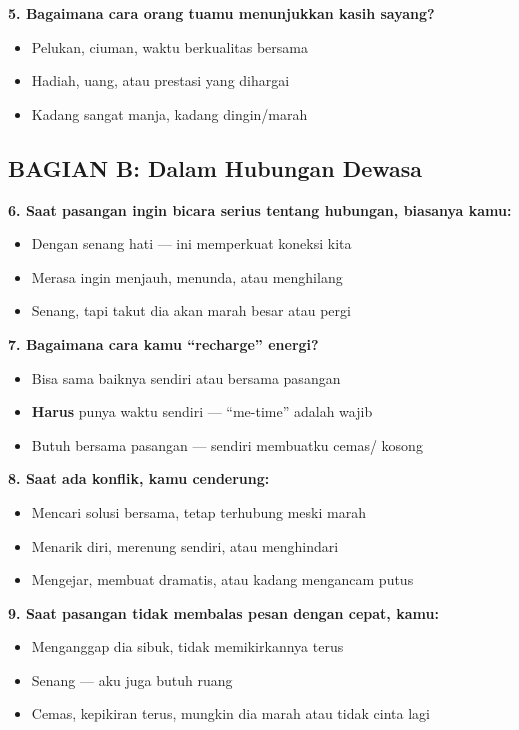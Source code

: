 \begin{exercisebox}
\textbf{5. Bagaimana cara orang tuamu menunjukkan kasih sayang?}
\begin{itemize}
    \item[A] Pelukan, ciuman, waktu berkualitas bersama
    \item[B] Hadiah, uang, atau prestasi yang dihargai
    \item[C] Kadang sangat manja, kadang dingin/marah
\end{itemize}

\subsection*{BAGIAN B: Dalam Hubungan Dewasa}

\textbf{6. Saat pasangan ingin bicara serius tentang hubungan, biasanya kamu:}
\begin{itemize}
    \item[A] Dengan senang hati --- ini memperkuat koneksi kita
    \item[B] Merasa ingin menjauh, menunda, atau menghilang
    \item[C] Senang, tapi takut dia akan marah besar atau pergi
\end{itemize}

\textbf{7. Bagaimana cara kamu ``recharge'' energi?}
\begin{itemize}
    \item[A] Bisa sama baiknya sendiri atau bersama pasangan
    \item[B] \textbf{Harus} punya waktu sendiri --- ``me-time'' adalah wajib
    \item[C] Butuh bersama pasangan --- sendiri membuatku cemas/ kosong
\end{itemize}

\textbf{8. Saat ada konflik, kamu cenderung:}
\begin{itemize}
    \item[A] Mencari solusi bersama, tetap terhubung meski marah
    \item[B] Menarik diri, merenung sendiri, atau menghindari
    \item[C] Mengejar, membuat dramatis, atau kadang mengancam putus
\end{itemize}

\textbf{9. Saat pasangan tidak membalas pesan dengan cepat, kamu:}
\begin{itemize}
    \item[A] Menganggap dia sibuk, tidak memikirkannya terus
    \item[B] Senang --- aku juga butuh ruang
    \item[C] Cemas, kepikiran terus, mungkin dia marah atau tidak cinta lagi
\end{itemize}


\end{exercisebox}
